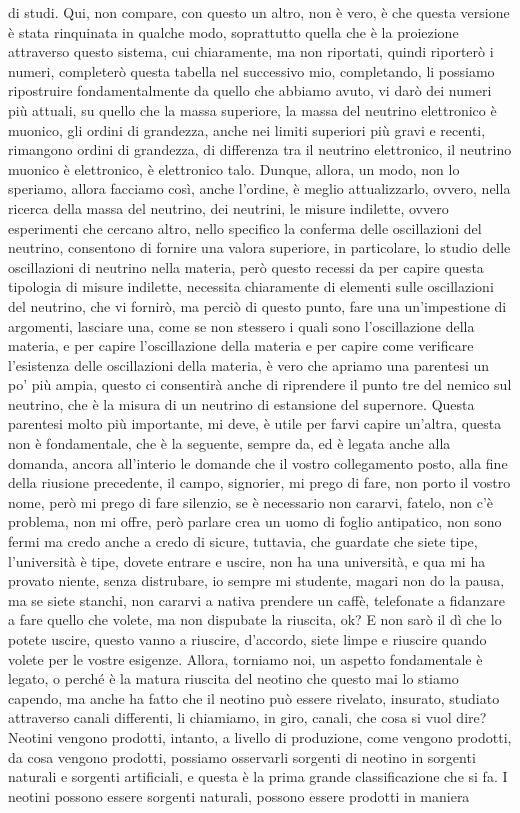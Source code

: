 di studi. Qui, non compare, con questo un altro, non è vero, è che questa versione è stata rinquinata in qualche modo, soprattutto quella che è la proiezione attraverso questo sistema, cui chiaramente, ma non riportati, quindi riporterò i numeri, completerò questa tabella nel successivo mio, completando, li possiamo ripostruire fondamentalmente da quello che abbiamo avuto, vi darò dei numeri più attuali, su quello che la massa superiore, la massa del neutrino elettronico è muonico, gli ordini di grandezza, anche nei limiti superiori più gravi e recenti, rimangono ordini di grandezza, di differenza tra il neutrino elettronico, il neutrino muonico è elettronico, è elettronico talo. Dunque, allora, un modo, non lo speriamo, allora facciamo così, anche l'ordine, è meglio attualizzarlo, ovvero, nella ricerca della massa del neutrino, dei neutrini, le misure indilette, ovvero esperimenti che cercano altro, nello specifico la conferma delle oscillazioni del neutrino, consentono di fornire una valora superiore, in particolare, lo studio delle oscillazioni di neutrino nella materia, però questo recessi da per capire questa tipologia di misure indilette, necessita chiaramente di elementi sulle oscillazioni del neutrino, che vi fornirò, ma perciò di questo punto, fare una un'impestione di argomenti, lasciare una, come se non stessero i quali sono l'oscillazione della materia, e per capire l'oscillazione della materia e per capire come verificare l'esistenza delle oscillazioni della materia, è vero che apriamo una parentesi un po' più ampia, questo ci consentirà anche di riprendere il punto tre del nemico sul neutrino, che è la misura di un neutrino di estansione del supernore. Questa parentesi molto più importante, mi deve, è utile per farvi capire un'altra, questa non è fondamentale, che è la seguente, sempre da, ed è legata anche alla domanda, ancora all'interio le domande che il vostro collegamento posto, alla fine della riusione precedente, il campo, signorier, mi prego di fare, non porto il vostro nome, però mi prego di fare silenzio, se è necessario non cararvi, fatelo, non c'è problema, non mi offre, però parlare crea un uomo di foglio antipatico, non sono fermi ma credo anche a credo di sicure, tuttavia, che guardate che siete tipe, l'università è tipe, dovete entrare e uscire, non ha una università, e qua mi ha provato niente, senza distrubare, io sempre mi studente, magari non do la pausa, ma se siete stanchi, non cararvi a nativa prendere un caffè, telefonate a fidanzare a fare quello che volete, ma non dispubate la riuscita, ok? E non sarò il dì che lo potete uscire, questo vanno a riuscire, d'accordo, siete limpe e riuscire quando volete per le vostre esigenze. Allora, torniamo noi, un aspetto fondamentale è legato, o perché è la matura riuscita del neotino che questo mai lo stiamo capendo, ma anche ha fatto che il neotino può essere rivelato, insurato, studiato attraverso canali differenti, li chiamiamo, in giro, canali, che cosa si vuol dire? Neotini vengono prodotti, intanto, a livello di produzione, come vengono prodotti, da cosa vengono prodotti, possiamo osservarli sorgenti di neotino in sorgenti naturali e sorgenti artificiali, e questa è la prima grande classificazione che si fa. I neotini possono essere sorgenti naturali, possono essere prodotti in maniera 